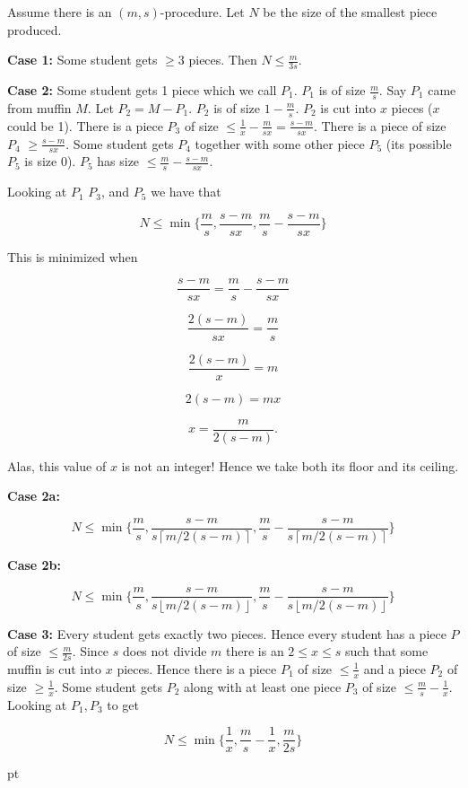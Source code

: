 \documentclass[12pt]{article}
\newcommand{\ceil}[1]{\left\lceil {#1}\right\rceil}
\newcommand{\floor}[1]{\left\lfloor{#1}\right\rfloor}
\newenvironment{proof}
    {\pagebreak[1]{\narrower\noindent {\bf Proof:\quad\nopagebreak}}}{\QED}
\newcommand{\yyskip}{\penalty-50\vskip 5pt plus 3pt minus 2pt}
\newcommand{\blackslug}{\hbox{\hskip 1pt
        \vrule width 4pt height 8pt depth 1.5pt\hskip 1pt}}
\newcommand{\QED}{{\penalty10000\parindent 0pt\penalty10000
        \hskip 8 pt\nolinebreak\blackslug\hfill\lower 8.5pt\null}
        \par\yyskip\pagebreak[1]}
\begin{document}
\begin{proof}
Assume there is an $(m,s)$-procedure.
Let $N$ be the size of the smallest piece produced.

\noindent
{\bf Case 1:} 
Some student  gets $\ge 3$ pieces.  Then $N\le \frac{m}{3s}$.

\noindent
{\bf Case 2:} Some student gets 1 piece which we call $P_1$. $P_1$ is of  size $\frac{m}{s}$. 
Say $P_1$ came from muffin $M$. Let $P_2=M-P_1$. $P_2$ is of size $1-\frac{m}{s}$.
$P_2$ is cut into $x$ pieces ($x$ could be 1).
There is a piece $P_3$ of size $\le \frac{1}{x}-\frac{m}{sx}=\frac{s-m}{sx}$.
There is a piece of size $P_4$ $\ge \frac{s-m}{sx}$.
Some student gets $P_4$ together with some other piece $P_5$ (its possible $P_5$ is size 0).
$P_5$ has size $\le \frac{m}{s} - \frac{s-m}{sx}$.

Looking at $P_1$ $P_3$, and $P_5$ we have that

$$N\le \min \{ \frac{m}{s}, \frac{s-m}{sx}, \frac{m}{s}-\frac{s-m}{sx} \}$$

This is minimized when 


$$\frac{s-m}{sx} = \frac{m}{s}-\frac{s-m}{sx}$$


$$\frac{2(s-m)}{sx} = \frac{m}{s}$$

$$\frac{2(s-m)}{x} = m$$

$$2(s-m)=mx$$


$$x= \frac{m}{2(s-m)}.$$

Alas, this value of $x$ is not an integer! Hence we take both its floor and its ceiling.

\noindent
{\bf Case 2a:}  

$$N\le \min \{ \frac{m}{s}, \frac{s-m}{s\ceil{m/2(s-m)}}, \frac{m}{s}-\frac{s-m}{s\ceil{m/2(s-m)}} \}$$

\noindent
{\bf Case 2b:}  

$$N\le \min \{ \frac{m}{s}, \frac{s-m}{s\floor{m/2(s-m)}}, \frac{m}{s}-\frac{s-m}{s\floor{m/2(s-m)}} \}$$


\noindent
{\bf Case 3:} 
Every student gets exactly two pieces.
Hence every student has a piece $P$ of size $\le \frac{m}{2s}$.
Since $s$ does not divide $m$ there is an
$2\le x\le s$ such that some muffin is cut into $x$ pieces. 
Hence there is a piece $P_1$ of size $\le \frac{1}{x}$ and a piece $P_2$ of size 
$\ge \frac{1}{x}$.
Some student gets $P_2$ along with at least one piece $P_3$ of size $\le \frac{m}{s}-\frac{1}{x}$. 
Looking at $P_1,P_3$ to get

$$N\le \min\biggl \{\frac{1}{x},\frac{m}{s}-\frac{1}{x},\frac{m}{2s}\biggr \} $$


\end{proof}
\end{document}
